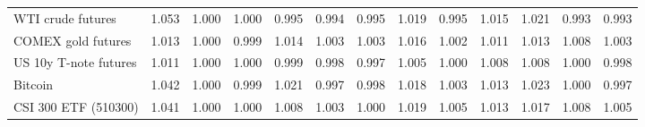 \begin{table}[!htbp]
\begin{adjustbox}{max width=\textwidth}
\begin{tabular}{lrrrrrrrrrrrr}
WTI crude futures & 1.053 & 1.000 & 1.000 & 0.995 & 0.994 & 0.995 & 1.019 & 0.995 & 1.015 & 1.021 & 0.993 & 0.993\\
COMEX gold futures & 1.013 & 1.000 & 0.999 & 1.014 & 1.003 & 1.003 & 1.016 & 1.002 & 1.011 & 1.013 & 1.008 & 1.003\\
US 10y T-note futures & 1.011 & 1.000 & 1.000 & 0.999 & 0.998 & 0.997 & 1.005 & 1.000 & 1.008 & 1.008 & 1.000 & 0.998\\
Bitcoin & 1.042 & 1.000 & 0.999 & 1.021 & 0.997 & 0.998 & 1.018 & 1.003 & 1.013 & 1.023 & 1.000 & 0.997\\
CSI 300 ETF (510300) & 1.041 & 1.000 & 1.000 & 1.008 & 1.003 & 1.000 & 1.019 & 1.005 & 1.013 & 1.017 & 1.008 & 1.005\\
\bottomrule
\end{tabular}
\end{adjustbox}
\end{table}